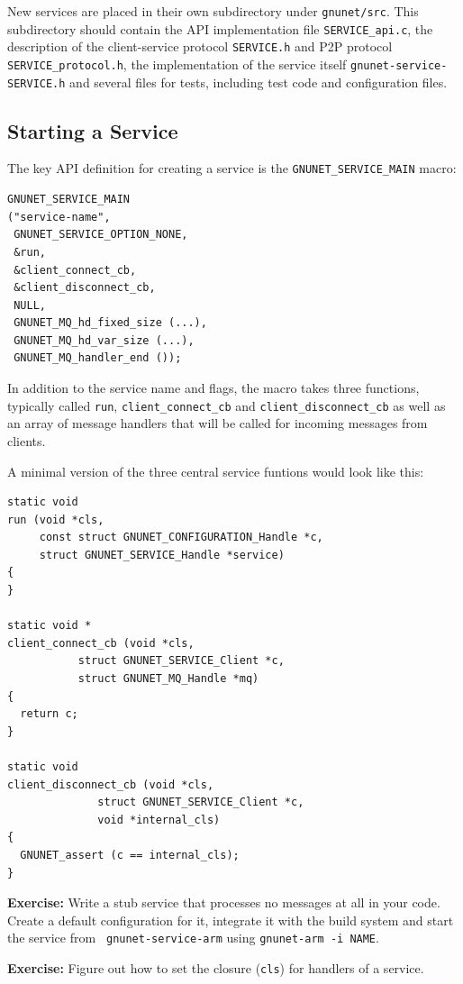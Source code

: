 \documentclass[10pt]{article}
\newcommand{\exercise}[1]{\noindent\begin{boxedminipage}{\textwidth}{\bf Exercise:} #1 \end{boxedminipage}}
\begin{document}
New services are placed in their own subdirectory under {\tt gnunet/src}.
This subdirectory should contain the API implementation file {\tt SERVICE\_api.c},
the description of the client-service protocol {\tt SERVICE.h} and P2P protocol
{\tt SERVICE\_protocol.h}, the implementation of the service itself
{\tt gnunet-service-SERVICE.h} and several files for tests, including test code
and configuration files.

\subsection{Starting a Service}

The key API definition for creating a service is the {\tt GNUNET\_SERVICE\_MAIN} macro:
\lstset{language=C}
\begin{lstlisting}
GNUNET_SERVICE_MAIN
("service-name",
 GNUNET_SERVICE_OPTION_NONE,
 &run,
 &client_connect_cb,
 &client_disconnect_cb,
 NULL,
 GNUNET_MQ_hd_fixed_size (...),
 GNUNET_MQ_hd_var_size (...),
 GNUNET_MQ_handler_end ());
\end{lstlisting}

In addition to the service name and flags, the macro takes three
functions, typically called {\tt run}, {\tt client\_connect\_cb} and
{\tt client\_disconnect\_cb} as well as an array of message handlers
that will be called for incoming messages from clients.

A minimal version of the three central service funtions would look
like this:

\lstset{language=c}
\begin{lstlisting}
static void
run (void *cls,
     const struct GNUNET_CONFIGURATION_Handle *c,
     struct GNUNET_SERVICE_Handle *service)
{
}

static void *
client_connect_cb (void *cls,
		   struct GNUNET_SERVICE_Client *c,
		   struct GNUNET_MQ_Handle *mq)
{
  return c;
}

static void
client_disconnect_cb (void *cls,
		      struct GNUNET_SERVICE_Client *c,
		      void *internal_cls)
{
  GNUNET_assert (c == internal_cls);
}
\end{lstlisting}

\exercise{Write a stub service that processes no messages at all
  in your code.  Create a default configuration for it, integrate it
  with the build system and start the service from {\tt
  gnunet-service-arm} using {\tt gnunet-arm -i NAME}.}

\exercise{Figure out how to set the closure ({\tt cls}) for handlers
  of a service.}
\end{document}
